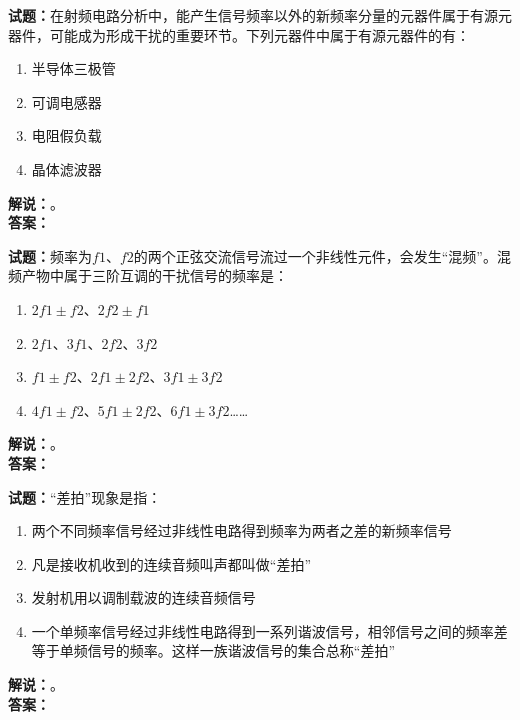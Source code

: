 \documentclass{ctexbook}
\begin{document}
\vspace{\baselineskip}

\noindent\textbf{试题：}在射频电路分析中，能产生信号频率以外的新频率分量的元器件属于有源元器件，可能成为形成干扰的重要环节。下列元器件中属于有源元器件的有：
\begin{enumerate}[leftmargin=3em]
  \item 半导体三极管
  \item 可调电感器
  \item 电阻假负载
  \item 晶体滤波器
\end{enumerate}
\noindent\textbf{解说：}\textbf{}。\\\noindent\textbf{答案：}

\vspace{\baselineskip}

\noindent\textbf{试题：}频率为\(f1\)、\(f2\)的两个正弦交流信号流过一个非线性元件，会发生“混频”。混频产物中属于三阶互调的干扰信号的频率是：
\begin{enumerate}[leftmargin=3em]
  \item \(2f1\pm f2\)、\(2f2\pm f1\)
  \item \(2f1\)、\(3f1\)、\(2f2\)、\(3f2\)
  \item \(f1\pm f2\)、\(2f1\pm 2f2\)、\(3f1\pm 3f2\)
  \item \(4f1\pm f2\)、\(5f1\pm 2f2\)、\(6f1\pm 3f2\)……
\end{enumerate}
\noindent\textbf{解说：}\textbf{}。\\\noindent\textbf{答案：}

\vspace{\baselineskip}

\noindent\textbf{试题：}“差拍”现象是指：
\begin{enumerate}[leftmargin=3em]
  \item 两个不同频率信号经过非线性电路得到频率为两者之差的新频率信号
  \item 凡是接收机收到的连续音频叫声都叫做“差拍”
  \item 发射机用以调制载波的连续音频信号
  \item 一个单频率信号经过非线性电路得到一系列谐波信号，相邻信号之间的频率差等于单频信号的频率。这样一族谐波信号的集合总称“差拍”
\end{enumerate}
\noindent\textbf{解说：}\textbf{}。\\\noindent\textbf{答案：}

\vspace{\baselineskip}
\end{document}
